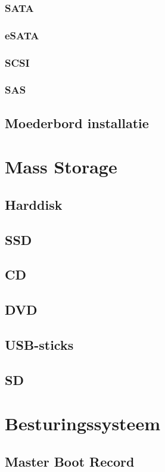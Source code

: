 \documentclass[a4paper,12pt,twoside,openright,titlepage]{book}
\begin{document}
\subsection{SATA}
\subsection{eSATA}
\subsection{SCSI}
\subsection{SAS}
\section{Moederbord installatie}

\chapter{Mass Storage}
\section{Harddisk}
\section{SSD}
\section{CD}
\section{DVD}
\section{USB-sticks}
\section{SD}

\chapter{Besturingssysteem}
\section{Master Boot Record}
\end{document}
